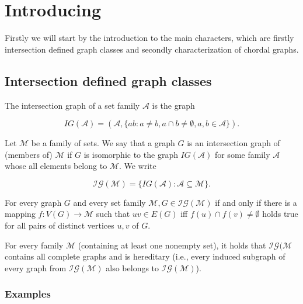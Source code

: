 \chapter{Introducing}

Firstly we will start by the introduction to the main characters, which are firstly intersection defined graph classes and secondly characterization of chordal graphs.

\section{Intersection defined graph classes}

\begin{defn}
	The intersection graph of a set family $\mathcal{A}$ is the graph
	
	$$
	IG(\mathcal{A}) = (\mathcal{A}, \{ab : a \neq b, a \cap b \neq \emptyset, a, b \in \mathcal{A}\}).
	$$
\end{defn}

\begin{defn}
	Let $\mathcal{M}$ be a family of sets. We say that a graph $G$ is an intersection graph of (members of) $\mathcal{M}$ if $G$ is isomorphic to the graph $IG(\mathcal{A})$ for some family $\mathcal{A}$ whose all elements belong to $\mathcal{M}$. We write
	
	$$
	\mathcal{IG}(\mathcal{M}) = \{IG(\mathcal{A}) : \mathcal{A} \subseteq \mathcal{M}\}.
	$$
\end{defn}

\begin{observ}
	For every graph $G$ and every set family $\mathcal{M}, G \in \mathcal{IG}(\mathcal{M})$ if and only if there is a mapping $f : V (G) \to \mathcal{M}$ such that $uv \in E(G)$ iff $f(u) \cap f(v) \neq \emptyset$ holds true for all pairs of distinct vertices $u, v$ of $G$.
\end{observ}

\begin{observ}
	For every family $\mathcal{M}$ (containing at least one nonempty set), it holds that $\mathcal{IG}(\mathcal{M}$ contains all complete graphs and is hereditary (i.e., every induced subgraph of every graph from $\mathcal{IG}(\mathcal{M})$ also	belongs to $\mathcal{IG}(\mathcal{M})$).
\end{observ}

\subsection{Examples}

